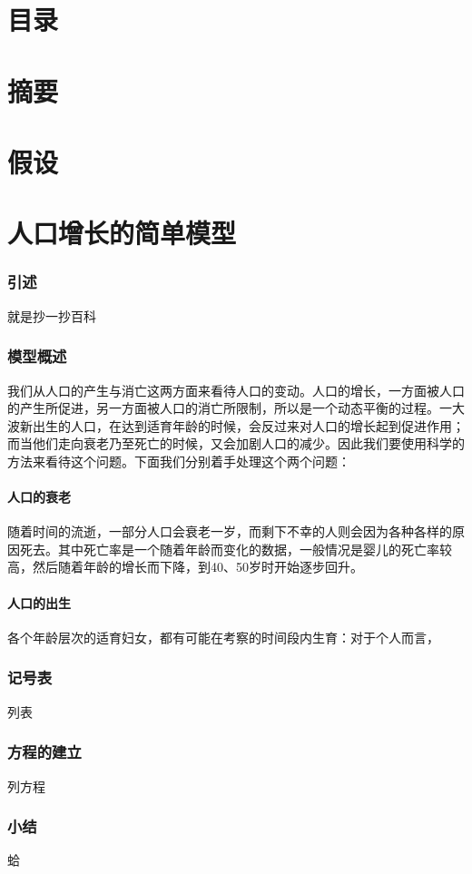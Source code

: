 \documentclass[11pt]{article}
\begin{document}
\part{目录}

\part{摘要}

\part{假设}

\part{人口增长的简单模型}
\section{引述}
	就是抄一抄百科
\section{模型概述}
我们从人口的产生与消亡这两方面来看待人口的变动。人口的增长，一方面被人口的产生所促进，另一方面被人口的消亡所限制，所以是一个动态平衡的过程。一大波新出生的人口，在达到适育年龄的时候，会反过来对人口的增长起到促进作用；而当他们走向衰老乃至死亡的时候，又会加剧人口的减少。因此我们要使用科学的方法来看待这个问题。下面我们分别着手处理这个两个问题：
\subsection{人口的衰老}
随着时间的流逝，一部分人口会衰老一岁，而剩下不幸的人则会因为各种各样的原因死去。其中死亡率是一个随着年龄而变化的数据，一般情况是婴儿的死亡率较高，然后随着年龄的增长而下降，到40、50岁时开始逐步回升。
\subsection{人口的出生}
各个年龄层次的适育妇女，都有可能在考察的时间段内生育：对于个人而言，
\section{记号表}
	列表
\section{方程的建立}
	列方程
\section{小结}
	蛤
	
\end{document}
